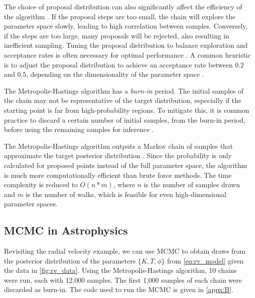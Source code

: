 \documentclass[preprint,longauthor]{aastex631}
\numberwithin{equation}{section}
\begin{document}
The choice of proposal distribution can also significantly affect the efficiency of the algorithm \citep{vontoussaintBayesianInferencePhysics2011}. If the proposal steps are too small, the chain will explore the parameter space slowly, leading to high correlation between samples. Conversely, if the steps are too large, many proposals will be rejected, also resulting in inefficient sampling. Tuning the proposal distribution to balance exploration and acceptance rates is often necessary for optimal performance \citep{vontoussaintBayesianInferencePhysics2011}. A common heuristic is to adjust the proposal distribution to achieve an acceptance rate between $0.2$ and $0.5$, depending on the dimensionality of the parameter space \citep{gelmanWeakConvergenceOptimal1997}.

The Metropolis-Hastings algorithm has a \textit{burn-in} period. The initial samples of the chain may not be representative of the target distribution, especially if the starting point is far from high-probability regions. To mitigate this, it is common practice to discard a certain number of initial samples, from the burn-in period, before using the remaining samples for inference \citep{vanravenzwaaijSimpleIntroductionMarkov2018}.

The Metropolis-Hastings algorithm outputs a Markov chain of samples that approximate the target posterior distribution \citep{hastingsMonteCarloSampling1970}. Since the probability is only calculated for proposed points instead of the full parameter space, the algorithm is much more computationally efficient than brute force methods. The time complexity is reduced to $O(n*m)$, where $n$ is the number of samples drawn and $m$ is the number of walks, which is feasible for even high-dimensional parameter spaces.

\subsection{MCMC in Astrophysics}

Revisiting the radial velocity example, we can use MCMC to obtain draws from the posterior distribution of the parameters $\{K,T,\phi\}$ from \autoref{eq:rv_model} given the data in \autoref{fig:rv_data}. Using the Metropolis-Hastings algorithm, 10 chains were run, each with 12,000 samples. The first 1,000 samples of each chain were discarded as burn-in. The code used to run the MCMC is given in \autoref{appx:B}.
\end{document}

